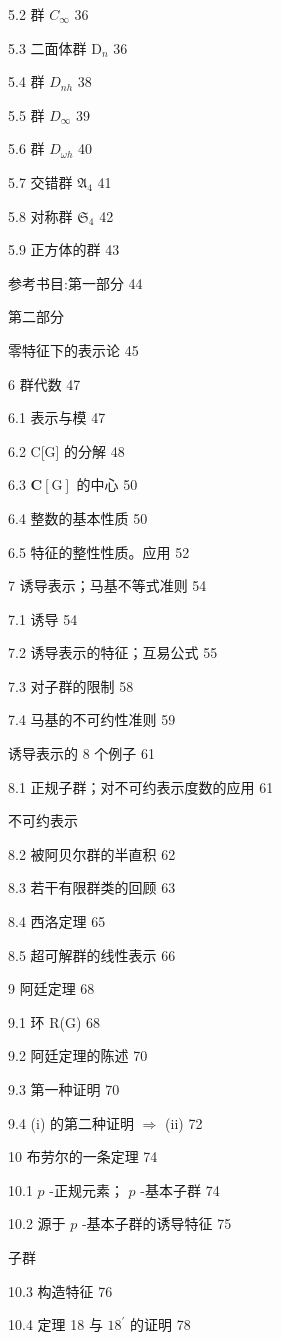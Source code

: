 \documentclass[10pt]{article}
\begin{document}
5.2 群 \({C}_{\infty }\) 36

5.3 二面体群 \({\mathrm{D}}_{n}\) 36

5.4 群 \({D}_{nh}\) 38

5.5 群 \({D}_{\infty }\) 39

5.6 群 \({D}_{\omega h}\) 40

5.7 交错群 \({\mathfrak{A}}_{4}\) 41

5.8 对称群 \({\mathfrak{S}}_{4}\) 42

5.9 正方体的群 43

参考书目:第一部分 44

第二部分

零特征下的表示论 45

6 群代数 47

6.1 表示与模 47

6.2 C[G] 的分解 48

6.3 \(\mathbf{C}\left\lbrack  \mathrm{G}\right\rbrack\) 的中心 50

6.4 整数的基本性质 50

6.5 特征的整性性质。应用 52

7 诱导表示；马基不等式准则 54

7.1 诱导 54

7.2 诱导表示的特征；互易公式 55

7.3 对子群的限制 58

7.4 马基的不可约性准则 59

诱导表示的 8 个例子 61

8.1 正规子群；对不可约表示度数的应用 61

不可约表示

8.2 被阿贝尔群的半直积 62

8.3 若干有限群类的回顾 63

8.4 西洛定理 65

8.5 超可解群的线性表示 66

9 阿廷定理 68

9.1 环 R(G) 68

9.2 阿廷定理的陈述 70

9.3 第一种证明 70

9.4 (i) 的第二种证明 \(\Rightarrow\) (ii) 72

10 布劳尔的一条定理 74

10.1 \(p\) -正规元素； \(p\) -基本子群 74

10.2 源于 \(p\) -基本子群的诱导特征 75

子群

10.3 构造特征 76

10.4 定理 18 与 \({18}^{\prime }\) 的证明 78
\end{document}
